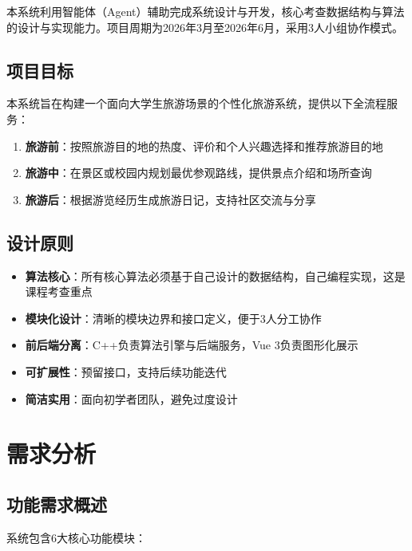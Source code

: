 \documentclass[12pt,a4paper]{report}
\begin{document}
本系统利用智能体（Agent）辅助完成系统设计与开发，核心考查数据结构与算法的设计与实现能力。项目周期为2026年3月至2026年6月，采用3人小组协作模式。

\section{项目目标}

本系统旨在构建一个面向大学生旅游场景的个性化旅游系统，提供以下全流程服务：

\begin{enumerate}[label=(\arabic*)]
    \item \textbf{旅游前}：按照旅游目的地的热度、评价和个人兴趣选择和推荐旅游目的地
    \item \textbf{旅游中}：在景区或校园内规划最优参观路线，提供景点介绍和场所查询
    \item \textbf{旅游后}：根据游览经历生成旅游日记，支持社区交流与分享
\end{enumerate}

\section{设计原则}

\begin{itemize}
    \item \textbf{算法核心}：所有核心算法必须基于自己设计的数据结构，自己编程实现，这是课程考查重点
    \item \textbf{模块化设计}：清晰的模块边界和接口定义，便于3人分工协作
    \item \textbf{前后端分离}：C++负责算法引擎与后端服务，Vue 3负责图形化展示
    \item \textbf{可扩展性}：预留接口，支持后续功能迭代
    \item \textbf{简洁实用}：面向初学者团队，避免过度设计
\end{itemize}


\chapter{需求分析}

\section{功能需求概述}

系统包含6大核心功能模块：
\end{document}
